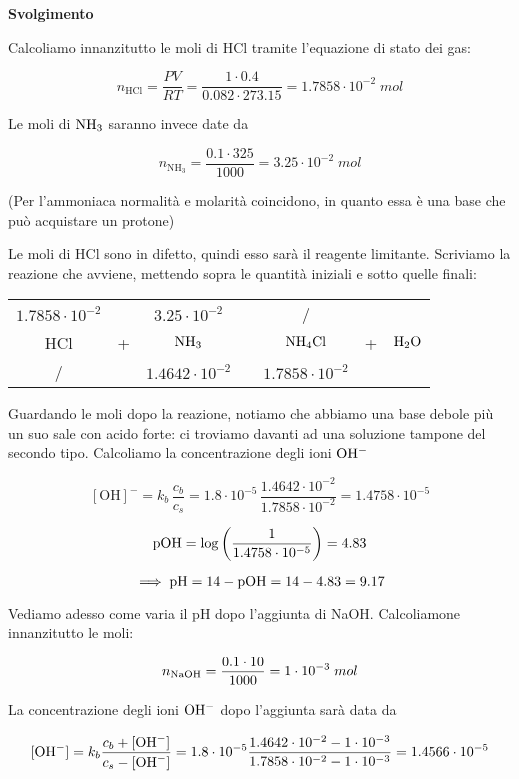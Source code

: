 \vspace{0.2cm}\large\textbf{Svolgimento}\normalsize

\vspace{0.2cm} Calcoliamo innanzitutto le moli di HCl tramite l'equazione di stato dei gas:

$$n_{\text{HCl}}=\frac{PV}{RT}=\frac{1 \cdot 0.4}{0.082 \cdot 273.15}=1.7858 \cdot 10^{-2}\;mol$$

Le moli di $\rm NH_3$ saranno invece date da

$$n_{\text{NH}_3}=\frac{0.1 \cdot 325}{1000}=3.25 \cdot 10^{-2}\;mol$$

(Per l'ammoniaca normalità e molarità coincidono, in quanto essa è una base che può acquistare un protone)

Le moli di HCl sono in difetto, quindi esso sarà il reagente limitante. Scriviamo la reazione che avviene, mettendo sopra le quantità iniziali e sotto quelle finali:

\begin{center}
    \begin{tabular}{ccccccc}
        $1.7858 \cdot 10^{-2}$ &  & $3.25 \cdot 10^{-2}$ & & / & &\\
        HCl & + & $\rm NH_3$ & \ce{->} & $\rm NH_4Cl$ & + & $\rm H_2O$\\
        / &  &  $1.4642 \cdot 10^{-2}$ & & $1.7858 \cdot 10^{-2}$ & &\\
    \end{tabular}
\end{center}

Guardando le moli dopo la reazione, notiamo che abbiamo una base debole più un suo sale con acido forte: ci troviamo davanti ad una soluzione tampone del secondo tipo. Calcoliamo la concentrazione degli ioni $\rm OH^-$

$$[\text{OH}]^-=k_b\,\frac{c_b}{c_s}
=1.8 \cdot 10^{-5}\,\frac{1.4642 \cdot 10^{-2}}{1.7858 \cdot 10^{-2}}
=1.4758 \cdot 10^{-5}$$

$$\rm pOH=\log \left( \frac{1}{1.4758 \cdot 10^{-5}} \right)=4.83$$

$$\implies \rm pH=14-pOH=14-4.83=9.17$$

Vediamo adesso come varia il pH dopo l'aggiunta di NaOH. Calcoliamone innanzitutto le moli:

$$n_{\rm NaOH}=\frac{0.1 \cdot 10}{1000}=1 \cdot 10^{-3}\;mol$$

La concentrazione degli ioni $\rm OH^-$ dopo l'aggiunta sarà data da

$${[\text{OH}^-]}=k_b \frac{c_b + {[\text{OH}^-]}}{c_s - \rm{[\text{OH}^-]}}
=1.8 \cdot 10^{-5}\frac{1.4642 \cdot 10^{-2} - 1 \cdot 10^{-3}}{1.7858 \cdot 10^{-2} - 1 \cdot 10^{-3}}=1.4566 \cdot 10^{-5}$$

